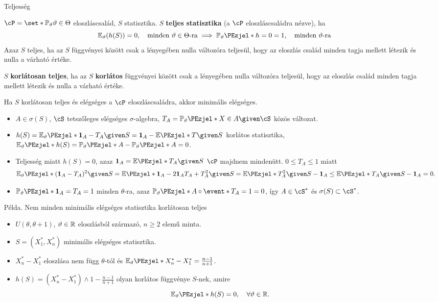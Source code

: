 \documentclass[aspectratio=169,notheorems,9pt,\option]{beamer}
\begin{document}
\begin{frame}{Teljesség}
  \begin{df}
    $\cP=\set*{\P[\theta]}{\theta\in\Theta}$ eloszláscsalád, 
    $S$ statisztika. $S$ \textbf{teljes statisztika} (a $\cP$ eloszláscsaládra nézve), ha 
    \begin{displaymath}
      \E[\theta](h(S))=0,\quad\text{minden $\theta\in\Theta$-ra}\implies \P[\theta]{h=0}=1,\quad\text{minden $\theta$-ra}
    \end{displaymath} 
    Azaz $S$ teljes, ha az $S$ függvényei között csak a lényegében nulla változóra teljesül, hogy  
    az eloszlás család minden tagja mellett létezik és nulla a várható értéke.

    $S$ \textbf{korlátosan teljes}, ha az $S$ \textbf{korlátos} függvényei között csak a 
    lényegében nulla változóra teljesül, hogy  
    az eloszlás család minden tagja mellett létezik és nulla a várható értéke.
  \end{df}
  \begin{theorem}
    Ha $S$ korlátosan teljes és elégséges a $\cP$ eloszláscsaládra, akkor minimális elégséges. 
  \end{theorem}
  \begin{itemize}
    \item $A\in\sigma(S)$, $\cS$ tetszőleges elégséges $\sigma$-algebra, $T_A=\P[\theta]{X\in A\given \cS}$ közös változat.
    \item $h(S)=\E[\theta]{\I[A]-T_A\given S}=\I[A]-\E{T\given S}$ korlátos statisztika, $\E[\theta]{h(S)}=\P[\theta]{A}-\P[\theta]{A}=0$.
    \item Teljesség miatt $h(S)=0$, azaz $\I[A]=\E{T_A\given S}$ $\cP$ majdnem mindenütt. $0\leq T_A\leq 1$ miatt
    \begin{displaymath}
      \E[\theta]{(\I[A]-T_A)^2\given S}=\E{\I[A]-2\I[A]T_A+T_A^2\given S}= \E{T_A^2\given S}-\I[A]\leq\E{T_A\given S}-\I[A]=0.
    \end{displaymath}
    \item $\P[\theta]{\I[A]=T_A}=1$ minden $\theta$-ra, 
    azaz $\P[\theta]{A\circ \event*{T_A=1}}=0$, így $A\in\cS^*$ és $\sigma(S)\subset\cS^*$.
  \end{itemize}  
\end{frame}


\begin{frame}{Példa. Nem minden minimális elégséges statisztika korlátosan teljes}
  \begin{itemize}
    \item $U(\theta,\theta+1)$, $\vartheta\in\mathbb{R}$ eloszlásból származó, $n\geq2$ elemű minta.
    \item $S=(X_1^*,X_n^*)$ minimális elégséges statisztika.
    \item $X_n^*-X_1^*$ eloszlása nem függ $\theta$-tól és $\E[\theta]{X_n^*-X_1^*}=\frac{n-1}{n+1}$.
    \item $h(S)=(X_n^*-X_1^*)\wedge1-\frac{n-1}{n+1}$ olyan korlátos függvénye $S$-nek, amire
    \begin{displaymath}
      \E[\theta]{h(S)}=0,\quad\forall \theta\in\real.
    \end{displaymath}
  \end{itemize}
\end{frame}
\end{document}
